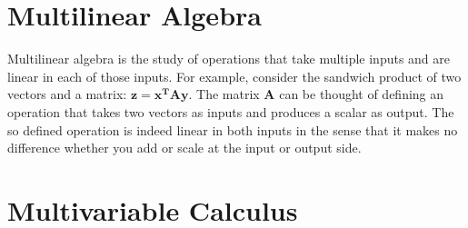 \documentclass[12pt]{article}
\begin{document}
\section{Multilinear Algebra}
Multilinear algebra is the study of operations that take multiple inputs and are linear in each of those inputs. For example, consider the sandwich product of two vectors and a matrix: $\mathbf{z = x^T A y}$. The matrix $\mathbf{A}$ can be thought of defining an operation that takes two vectors as inputs and produces a scalar as output. The so defined operation is indeed linear in both inputs in the sense that it makes no difference whether you add or scale at the input or output side.

\section{Multivariable Calculus}
\end{document}
